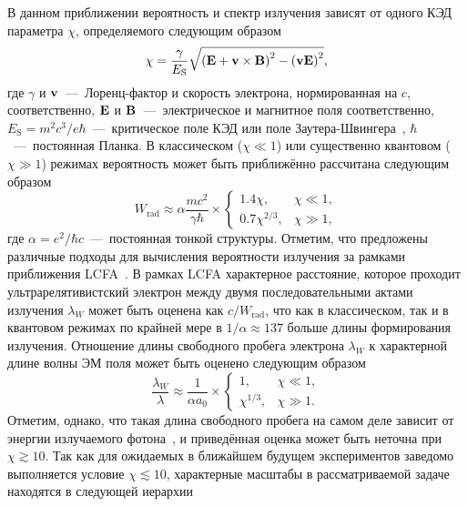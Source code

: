 В данном приближении вероятность и спектр излучения зависят от одного КЭД параметра $\chi$, определяемого следующим образом
\begin{equation}
    \label{eq:ch1/sec1/chi}
    \chi = \frac{\gamma}{E_\mathrm{S}} \sqrt{{\left( \vb{E} + \vb{v}\times\vb{B} \right)}^2 - {\left(\vb{v}\vb{E} \right)}^2} ,
\end{equation}
где $\gamma$ и $\vb{v}$~---~Лоренц-фактор и скорость электрона, нормированная на $c$, соответственно, $\vb{E}$ и $\vb{B}$~---~электрическое и магнитное поля соответственно, ${E_\mathrm{S} = m^2 c^3/e\hbar}$~---~критическое поле КЭД или поле Заутера-Швингера~\cite{berestetskii1982quantum}, $\hbar$~---~постоянная Планка.
В классическом ($\chi \ll 1$) или существенно квантовом ($\chi \gg 1$) режимах вероятность может быть приближённо рассчитана следующим образом
\begin{equation}
    W_\mathrm{rad} \approx \alpha \frac{m c^2}{\gamma\hbar} \times
    \begin{cases}
        1.4 \chi, & \chi \ll 1, \\
        0.7 \chi^{2/3}, & \chi \gg 1,
    \end{cases}
\end{equation}
где $\alpha = e^2/\hbar c$~---~постоянная тонкой структуры.
Отметим, что предложены различные подходы для вычисления вероятности излучения за рамками приближения LCFA~\cite{khokonov2002standard, ilderton2019extended, heinzl2020locally, gelfer2022nonlinear, Podszus19}.
В рамках LCFA характерное расстояние, которое проходит ультрарелятивистский электрон между двумя последовательными актами излучения $\lambda_W$ может быть оценена как $c/W_\mathrm{rad}$, что как в классическом, так и в квантовом режимах по крайней мере в $1/\alpha\approx137$ больше длины формирования излучения.
Отношение длины свободного пробега электрона $\lambda_W$ к характерной длине волны ЭМ поля может быть оценено следующим образом
\begin{equation}
    \frac{\lambda_W}{\lambda} \approx \frac{1}{\alpha a_0} \times
    \begin{cases}
        1, & \chi \ll 1, \\
        \chi^{1/3}, & \chi \gg 1.
    \end{cases}
\end{equation}
Отметим, однако, что такая длина свободного пробега на самом деле зависит от энергии излучаемого фотона~\cite{Artemenko20}, и приведённая оценка может быть неточна при $\chi \gtrsim 10$.
Так как для ожидаемых в ближайшем будущем экспериментов заведомо выполняется условие $\chi \lesssim 10$, характерные масштабы в рассматриваемой задаче находятся в следующей иерархии
